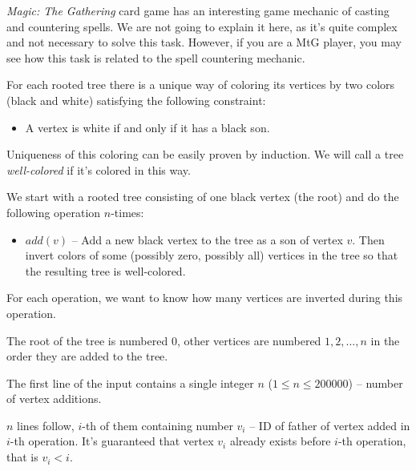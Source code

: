 





\emph{Magic: The Gathering} card game has an interesting game mechanic
of casting and countering spells. We are not going to explain it here,
as it's quite complex and not necessary to solve this task. However, if 
you are a MtG player, you may see how this task is related to the spell
countering mechanic.


For each rooted tree there is a unique way of coloring its vertices by two colors
(black and white) satisfying the following constraint:
\begin{itemize}
\item A vertex is white if and only if it has a black son.
\end{itemize}

Uniqueness of this coloring can be easily proven by induction.
We will call a tree \emph{well-colored} if it's colored in this way.


We start with a rooted tree consisting of one black vertex (the root) and do
the following operation $n$-times:

\begin{itemize}
\item $add(v)$ -- Add a new black vertex to the tree as a son of vertex $v$. Then
                  invert colors of some (possibly zero, possibly all) vertices in
                  the tree so that the resulting tree is well-colored.
\end{itemize}

For each operation, we want to know how many vertices are inverted during this operation.


The root of the tree is numbered $0$, other vertices are numbered $1, 2, \dots, n$ in the 
order they are added to the tree.

The first line of the input contains a single integer $n$ ($1 \leq n \leq 200000$) -- 
number of vertex additions.

$n$ lines follow, $i$-th of them containing number $v_i$ -- ID of father of vertex added in
$i$-th operation. It's guaranteed that vertex $v_i$ already exists before $i$-th operation,
that is $v_i < i$.

